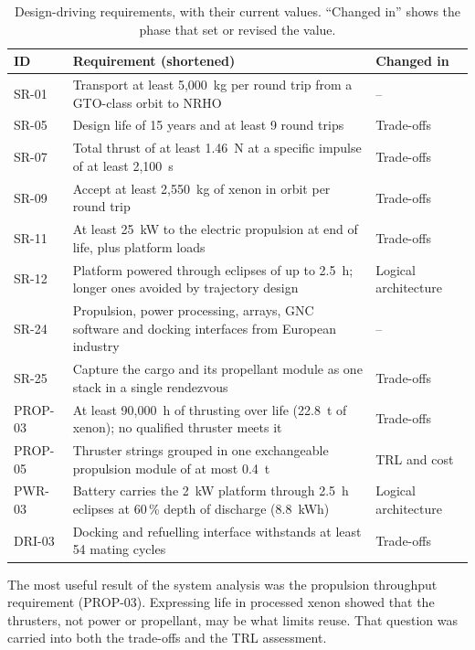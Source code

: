 \documentclass[11pt,a4paper]{article}
\newcommand{\id}[1]{#1}
\begin{document}
\begin{table}[htbp]\centering\small
\caption{Design-driving requirements, with their current values. ``Changed in'' shows the phase that set or revised the value.}\label{tab:keyreq}
\begin{tabularx}{\linewidth}{@{}P{1.6cm}LP{2.55cm}@{}}
\toprule
ID & Requirement (shortened) & Changed in \\
\midrule
\id{SR-01} & Transport at least 5,000~kg per round trip from a GTO-class orbit to NRHO & -- \\
\id{SR-05} & Design life of 15 years and at least 9 round trips & Trade-offs \\
\id{SR-07} & Total thrust of at least 1.46~N at a specific impulse of at least 2,100~s & Trade-offs \\
\id{SR-09} & Accept at least 2,550~kg of xenon in orbit per round trip & Trade-offs \\
\id{SR-11} & At least 25~kW to the electric propulsion at end of life, plus platform loads & Trade-offs \\
\id{SR-12} & Platform powered through eclipses of up to 2.5~h; longer ones avoided by trajectory design & Logical architecture \\
\id{SR-24} & Propulsion, power processing, arrays, GNC software and docking interfaces from European industry & -- \\
\id{SR-25} & Capture the cargo and its propellant module as one stack in a single rendezvous & Trade-offs \\
\id{PROP-03} & At least 90,000~h of thrusting over life (22.8~t of xenon); no qualified thruster meets it & Trade-offs \\
\id{PROP-05} & Thruster strings grouped in one exchangeable propulsion module of at most 0.4~t & TRL and cost \\
\id{PWR-03} & Battery carries the 2~kW platform through 2.5~h eclipses at 60\,\% depth of discharge (8.8~kWh) & Logical architecture \\
\id{DRI-03} & Docking and refuelling interface withstands at least 54 mating cycles & Trade-offs \\
\bottomrule
\end{tabularx}
\end{table}

The most useful result of the system analysis was the propulsion throughput requirement (\id{PROP-03}). Expressing life in processed xenon showed that the thrusters, not power or propellant, may be what limits reuse. That question was carried into both the trade-offs and the TRL assessment.
\end{document}
